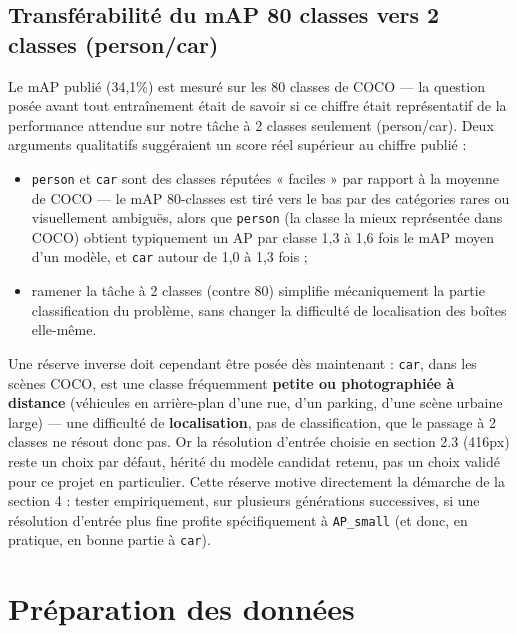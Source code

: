 \documentclass[11pt,a4paper]{article}
\let\Oldsubsection\subsection
\renewcommand{\subsection}{\FloatBarrier\Oldsubsection}
\begin{document}
    \subsection{Transférabilité du mAP 80 classes vers 2 classes (person/car)}
    
    Le mAP publié (34,1\%) est mesuré sur les 80 classes de COCO --- la
    question posée avant tout entraînement était de savoir si ce chiffre
    était représentatif de la performance attendue sur notre tâche à
    2 classes seulement (person/car). Deux arguments qualitatifs
    suggéraient un score réel supérieur au chiffre publié :
    
    \begin{itemize}[leftmargin=1.5em]
      \item \texttt{person} et \texttt{car} sont des classes réputées
        « faciles » par rapport à la moyenne de COCO --- le mAP 80-classes
        est tiré vers le bas par des catégories rares ou visuellement
        ambiguës, alors que \texttt{person} (la classe la mieux représentée
        dans COCO) obtient typiquement un AP par classe 1,3 à 1,6 fois le
        mAP moyen d'un modèle, et \texttt{car} autour de 1,0 à 1,3 fois ;
      \item ramener la tâche à 2 classes (contre 80) simplifie
        mécaniquement la partie classification du problème, sans changer
        la difficulté de localisation des boîtes elle-même.
    \end{itemize}
    
    Une réserve inverse doit cependant être posée dès maintenant :
    \texttt{car}, dans les scènes COCO, est une classe fréquemment
    \textbf{petite ou photographiée à distance} (véhicules en
    arrière-plan d'une rue, d'un parking, d'une scène urbaine large) ---
    une difficulté de \textbf{localisation}, pas de classification, que le
    passage à 2 classes ne résout donc pas. Or la résolution d'entrée
    choisie en section 2.3 (416px) reste un choix par défaut, hérité du
    modèle candidat retenu, pas un choix validé pour ce projet en particulier.
    Cette réserve motive directement la démarche de la section 4 : tester
    empiriquement, sur plusieurs générations successives, si une résolution
    d'entrée plus fine profite spécifiquement à \texttt{AP\_small} (et donc,
    en pratique, en bonne partie à \texttt{car}).
    
    \section{Préparation des données}
    
\end{document}
